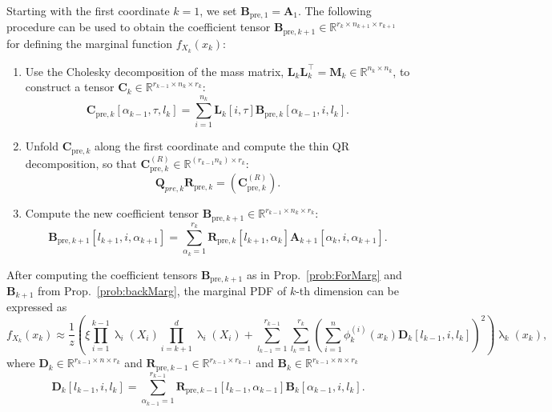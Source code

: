\begin{prop}
	\label{prob:ForMarg}
	Starting with the first coordinate $k = 1$, we set $\bm{B}_{\text{pre},1} = \bm{A}_1$. The following procedure can be used to obtain the coefficient tensor $\bm{B}_{\text{pre},k+1} \in \mathbb{R}^{r_{k} \times n_{k+1} \times r_{k+1}}$ for defining the marginal function $f_{X_k}(x_k)$:
	\begin{enumerate}
		\item Use the Cholesky decomposition of the mass matrix, $\bm{L}_k \bm{L}_k^\top = \bm{M}_k \in \mathbb{R}^{n_k \times n_k}$, to construct a tensor $\bm{C}_k \in \mathbb{R}^{r_{k-1} \times n_k \times r_k}$:
		\begin{equation}
			\bm{C}_{\text{pre},k}[\alpha_{k-1}, \tau, l_k] = \sum_{i=1}^{n_k} \bm{L}_k[i, \tau] \bm{B}_{\text{pre},k}[\alpha_{k-1}, i, l_k] .
		\end{equation}
		\item Unfold $\bm{C}_{\text{pre},k}$ along the first coordinate and compute the thin QR decomposition, so that $\bm{C}_{\text{pre},k}^{(R)} \in \mathbb{R}^{(r_{k-1} n_k ) \times r_k}$:
		\begin{equation}
			\bm{Q}_{pre,k}\bm{R}_{\text{pre},k} = {(\bm{C}_{\text{pre},k}^{(R)})}.
		\end{equation}
		\item Compute the new coefficient tensor $\bm{B}_{\text{pre}, k+1} \in \mathbb{R}^{r_{k-1} \times n_k \times r_k} $:
		\begin{equation}
			\bm{B}_{\text{pre}, k+1}[l_{k+1}, i, \alpha_{k+1}] = \sum_{\alpha_{k}=1}^{r_{k}} \bm{R}_{\text{pre},k}[l_{k+1}, \alpha_{k}] \bm{A}_{k+1}[\alpha_{k}, i, \alpha_{k+1}] .
		\end{equation}
	\end{enumerate}
\end{prop}
After computing the coefficient tensors $\bm{B}_{\text{pre}, k+1}$ as in Prop.~\ref{prob:ForMarg} and $\bm{B}_{k+1}$ from Prop.~\ref{prob:backMarg}, the marginal PDF of $k$-th dimension can be expressed as
\begin{equation}
	f_{X_k}(x_k)  \approx \frac{1}{z} \left(\xi \prod_{i=1}^{k-1} \uplambda_i(X_i) \prod_{i=k+1}^{d} \uplambda_i(X_i) + \sum_{l_{k-1}=1}^{r_{k-1}} \sum_{l_k=1}^{r_k} \left(\sum_{i=1}^{n} \phi^{(i)}_k(x_k) \bm{D}_k[l_{k-1},i, l_k] \right)^2 \right) \uplambda_k(x_k), \label{eq:MargTT}
\end{equation}
where $\bm{D}_k \in \mathbb{R}^{r_{k-1} \times n \times r_k}$ and $\bm{R}_{\text{pre},k-1}\in \mathbb{R}^{r_{k-1} \times r_{k-1}}$ and $\bm{B}_k \in \mathbb{R}^{r_{k-1} \times n \times r_k}$
\begin{equation}
	\bm{D}_k[l_{k-1},i,l_k] = \sum_{\alpha_{k-1}=1}^{r_{k-1}}  \bm{R}_{\text{pre},k-1}[l_{k-1}, \alpha_{k-1}] \bm{B}_k[\alpha_{k-1}, i, l_k].
\end{equation}

